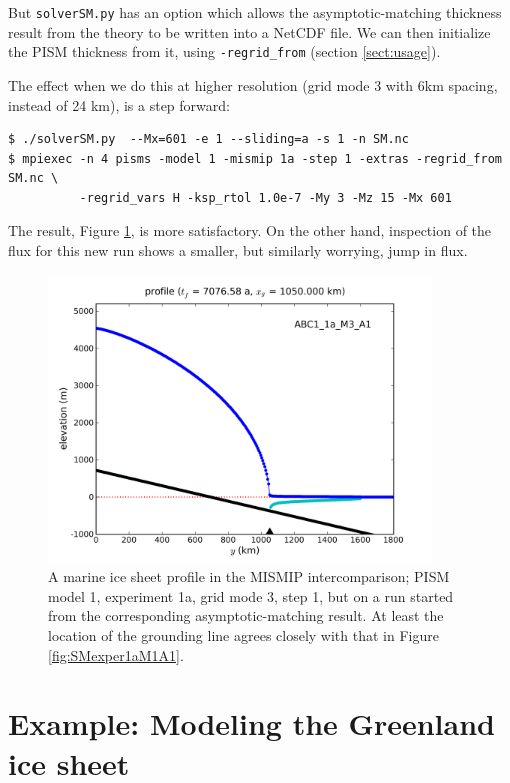 \documentclass[11pt,final]{amsart}
\begin{document}
But \verb|solverSM.py| has an option which allows the asymptotic-matching thickness result from the \cite{SchoofMarine1} theory to be written into a NetCDF file.  We can then initialize the PISM thickness from it, using \verb|-regrid_from| (section \ref{sect:usage}).

The effect when we do this at higher resolution (grid mode 3 with 6km spacing, instead of 24 km), is a step forward:

\begin{verbatim}
$ ./solverSM.py  --Mx=601 -e 1 --sliding=a -s 1 -n SM.nc
$ mpiexec -n 4 pisms -model 1 -mismip 1a -step 1 -extras -regrid_from SM.nc \
          -regrid_vars H -ksp_rtol 1.0e-7 -My 3 -Mz 15 -Mx 601
\end{verbatim}
\noindent The result, Figure \ref{fig:MISMIPmodel1exper1aM3A1FROMSM}, is more satisfactory.  On the other hand, inspection of the flux for this new run shows a smaller, but similarly worrying, jump in flux.

\begin{figure}[ht]
\includegraphics[width=4.0in,keepaspectratio=true]{figs/profile_EBU1_1a_M3_A1}
\caption{A marine ice sheet profile in the MISMIP intercomparison; PISM model 1, experiment 1a, grid mode 3, step 1, but on a run started from the corresponding asymptotic-matching result.  At least the location of the grounding line agrees closely with that in Figure \ref{fig:SMexper1aM1A1}.}
\label{fig:MISMIPmodel1exper1aM3A1FROMSM}
\end{figure}


\clearpage\newpage

\section{Example: Modeling the Greenland ice sheet}\label{sect:green}  
\end{document}
